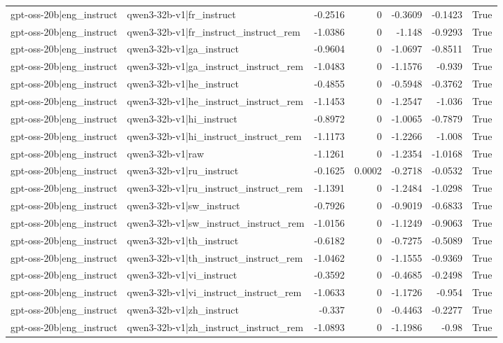 \begin{table}
\begin{tabular}{l l r r r r l}
gpt-oss-20b|eng_instruct & qwen3-32b-v1|fr_instruct & -0.2516 & 0 & -0.3609 & -0.1423 & True \\
gpt-oss-20b|eng_instruct & qwen3-32b-v1|fr_instruct_instruct_rem & -1.0386 & 0 & -1.148 & -0.9293 & True \\
gpt-oss-20b|eng_instruct & qwen3-32b-v1|ga_instruct & -0.9604 & 0 & -1.0697 & -0.8511 & True \\
gpt-oss-20b|eng_instruct & qwen3-32b-v1|ga_instruct_instruct_rem & -1.0483 & 0 & -1.1576 & -0.939 & True \\
gpt-oss-20b|eng_instruct & qwen3-32b-v1|he_instruct & -0.4855 & 0 & -0.5948 & -0.3762 & True \\
gpt-oss-20b|eng_instruct & qwen3-32b-v1|he_instruct_instruct_rem & -1.1453 & 0 & -1.2547 & -1.036 & True \\
gpt-oss-20b|eng_instruct & qwen3-32b-v1|hi_instruct & -0.8972 & 0 & -1.0065 & -0.7879 & True \\
gpt-oss-20b|eng_instruct & qwen3-32b-v1|hi_instruct_instruct_rem & -1.1173 & 0 & -1.2266 & -1.008 & True \\
gpt-oss-20b|eng_instruct & qwen3-32b-v1|raw & -1.1261 & 0 & -1.2354 & -1.0168 & True \\
gpt-oss-20b|eng_instruct & qwen3-32b-v1|ru_instruct & -0.1625 & 0.0002 & -0.2718 & -0.0532 & True \\
gpt-oss-20b|eng_instruct & qwen3-32b-v1|ru_instruct_instruct_rem & -1.1391 & 0 & -1.2484 & -1.0298 & True \\
gpt-oss-20b|eng_instruct & qwen3-32b-v1|sw_instruct & -0.7926 & 0 & -0.9019 & -0.6833 & True \\
gpt-oss-20b|eng_instruct & qwen3-32b-v1|sw_instruct_instruct_rem & -1.0156 & 0 & -1.1249 & -0.9063 & True \\
gpt-oss-20b|eng_instruct & qwen3-32b-v1|th_instruct & -0.6182 & 0 & -0.7275 & -0.5089 & True \\
gpt-oss-20b|eng_instruct & qwen3-32b-v1|th_instruct_instruct_rem & -1.0462 & 0 & -1.1555 & -0.9369 & True \\
gpt-oss-20b|eng_instruct & qwen3-32b-v1|vi_instruct & -0.3592 & 0 & -0.4685 & -0.2498 & True \\
gpt-oss-20b|eng_instruct & qwen3-32b-v1|vi_instruct_instruct_rem & -1.0633 & 0 & -1.1726 & -0.954 & True \\
gpt-oss-20b|eng_instruct & qwen3-32b-v1|zh_instruct & -0.337 & 0 & -0.4463 & -0.2277 & True \\
gpt-oss-20b|eng_instruct & qwen3-32b-v1|zh_instruct_instruct_rem & -1.0893 & 0 & -1.1986 & -0.98 & True \\

\end{tabular}
\end{table}
